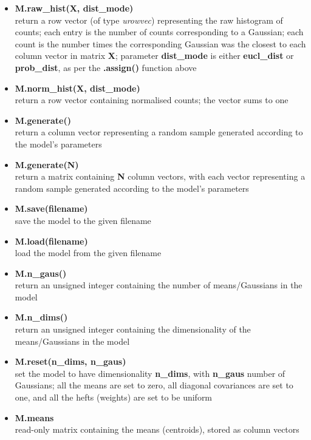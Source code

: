 \begin{small}
\begin{itemize}
\item
{\bf M.raw\_hist(X, dist\_mode)}\\
return a row vector (of type {\it urowvec}) representing the raw histogram of counts;
each entry is the number of counts corresponding to a Gaussian;
each count is the number times the corresponding Gaussian was the closest to each column vector in matrix {\bf X};
parameter {\bf dist\_mode} is either {\bf eucl\_dist} or {\bf prob\_dist}, as per the {\bf .assign()} function above

\item
{\bf M.norm\_hist(X, dist\_mode)}\\
return a row vector containing normalised counts; the vector sums to one

\item
{\bf M.generate()}\\
return a column vector representing a random sample generated according to the model's parameters

\item
{\bf M.generate(N)}\\
return a matrix containing {\bf N} column vectors, with each vector representing a random sample generated according to the model's parameters

\item
{\bf M.save(filename)}\\
save the model to the given filename

\item
{\bf M.load(filename)}\\
load the model from the given filename

\item
{\bf M.n\_gaus()}\\
return an unsigned integer containing the number of means/Gaussians in the model

\item
{\bf M.n\_dims()}\\
return an unsigned integer containing the dimensionality of the means/Gaussians in the model

\item
{\bf M.reset(n\_dims, n\_gaus)}\\
set the model to have dimensionality {\bf n\_dims}, with {\bf n\_gaus} number of Gaussians;
all the means are set to zero, all diagonal covariances are set to one, and all the hefts (weights) are set to be uniform

\item
{\bf M.means}\\
read-only matrix containing the means (centroids), stored as column vectors


\end{itemize}
\end{small}
